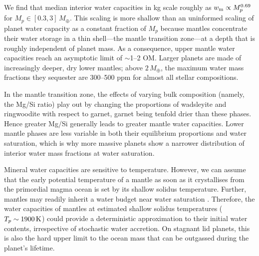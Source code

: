 We find that median interior water capacities in kg scale roughly as $w_{\rm m} \propto M_p^{0.69}$ for $M_p \in [0.3, 3]\,M_\oplus$. This scaling is more shallow than an uninformed scaling of planet water capacity as a constant fraction of $M_p$ because mantles concentrate their water storage in a thin shell---the mantle transition zone---at a depth that is roughly independent of planet mass. As a consequence, upper mantle water capacities reach an asymptotic limit of $\sim$1--2 OM. Larger planets are made of increasingly deeper, dry lower mantles; above $2\,M_\oplus$, the maximum water mass fractions they sequester are 300--500 ppm for almost all stellar compositions.

In the mantle transition zone, the effects of varying bulk composition (namely, the Mg/Si ratio) play out by changing the proportions of wadsleyite and ringwoodite with respect to garnet, garnet being tenfold drier than these phases. Hence greater Mg/Si generally leads to greater mantle water capacities. Lower mantle phases are less variable in both their equilibrium proportions and water saturation, which is why more massive planets show a narrower distribution of interior water mass fractions at water saturation. 


Mineral water capacities are sensitive to temperature. However, we can assume that the early potential temperature of a mantle as soon as it crystallises from the primordial magma ocean is set by its shallow solidus temperature. Further, mantles may readily inherit a water budget near water saturation \citep{tikoo_fate_2017, dorn_hidden_2021, bower_retention_2021, miyazaki_wet_2022}. Therefore, the water capacities of mantles at estimated shallow solidus temperatures ($T_p \sim 1900\,{\rm K}$) could provide a deterministic approximation to their initial water contents, irrespective of stochastic water accretion. On stagnant lid planets, this is also the hard upper limit to the ocean mass that can be outgassed during the planet's lifetime.

